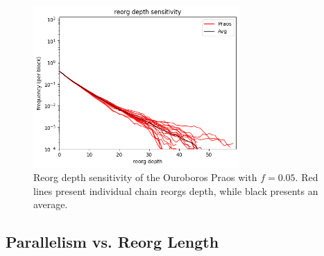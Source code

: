 \begin{figure}[htbp!]
\includegraphics[width=0.7\textwidth]{figs/reorg-praos-with-avg-it20}
\caption{Reorg depth sensitivity of the Ouroboros Praos with $f=0.05$. Red lines present individual chain reorgs depth, while black presents an average.}
\label{fig:praos}
\end{figure}


\subsection{Parallelism vs. Reorg Length}

